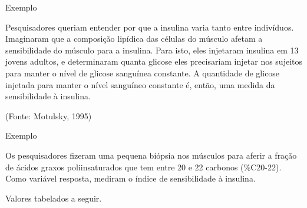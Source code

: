 \documentclass{beamer}
\begin{document}
\begin{frame}{Exemplo}
 \begin{example}
   Pesquisadores queriam entender por que a insulina varia tanto entre
   indivíduos. Imaginaram que a composição lipídica das células do
   músculo afetam a sensibilidade do músculo para a insulina. Para
   isto, eles injetaram insulina em 13 jovens adultos, e determinaram
   quanta glicose eles precisariam injetar nos sujeitos para manter o
   nível de glicose sanguínea constante. A quantidade de glicose
   injetada para manter o nível sanguíneo constante é, então, uma
   medida da sensibilidade à insulina.


    (Fonte: Motulsky, 1995)
  \end{example}
\end{frame}

\begin{frame}{Exemplo}
  \begin{example}
    Os pesquisadores fizeram uma pequena biópsia nos músculos para
    aferir a fração de ácidos graxos poliinsaturados que tem entre 20
    e 22 carbonos (\%C20-22). Como variável resposta, mediram o índice
    de sensibilidade à insulina.
  \end{example}
  Valores tabelados a seguir.
\end{frame}
\end{document}
